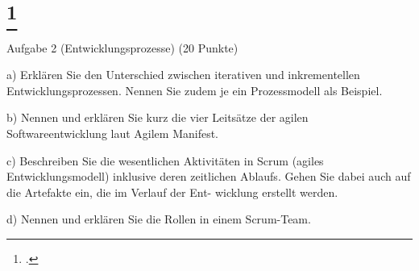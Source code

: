 \documentclass{lehramt-informatik-aufgabe}
\begin{document}
\liAufgabenTitel{}
\section{
\footcite{66116:2021:03}}

Aufgabe 2 (Entwicklungsprozesse) (20 Punkte)

a) Erklären Sie den Unterschied zwischen iterativen und inkrementellen Entwicklungsprozessen.
Nennen Sie zudem je ein Prozessmodell als Beispiel.

b) Nennen und erklären Sie kurz die vier Leitsätze der agilen Softwareentwicklung laut Agilem
Manifest.

c) Beschreiben Sie die wesentlichen Aktivitäten in Scrum (agiles Entwicklungsmodell) inklusive
deren zeitlichen Ablaufs. Gehen Sie dabei auch auf die Artefakte ein, die im Verlauf der Ent-
wicklung erstellt werden.

d) Nennen und erklären Sie die Rollen in einem Scrum-Team.
\end{document}
